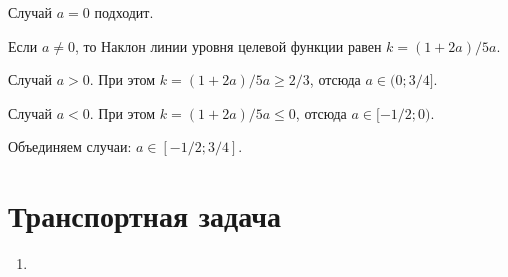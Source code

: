 \documentclass[12pt]{article}
\begin{document}
\begin{enumerate}
Случай $a = 0$ подходит.

Если $a \neq 0$, то Наклон линии уровня целевой функции равен $k = (1 + 2a) / 5a$.

Случай $a > 0$. При этом $k = (1 + 2a)/5a \geq 2/3$, отсюда $a \in (0; 3/4]$.

Случай $a < 0$. При этом $k = (1 + 2a)/5a \leq 0$, отсюда $a \in [-1/2; 0)$.

Объединяем случаи: $a \in [-1/2; 3/4]$.

\end{enumerate}

\section*{Транспортная задача}

\begin{enumerate}
  \item 
\end{enumerate}
\end{document}
